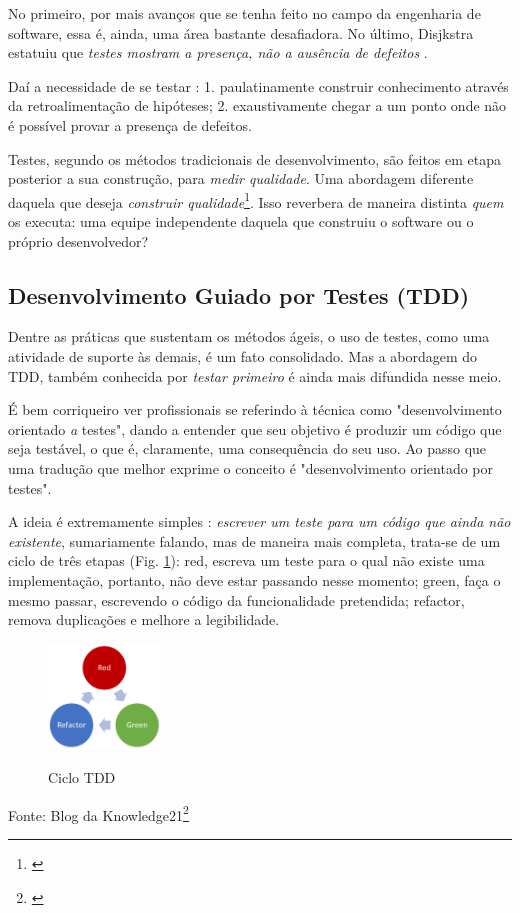 \documentclass[12pt,a4paper,oneside,english,brazil]{article}
\begin{document}
    No primeiro, por mais avanços que se tenha feito no campo da engenharia de
    software, essa é, ainda, uma área bastante desafiadora. No último, Disjkstra
    estatuiu que \emph{testes mostram a presença, não a ausência de defeitos}
    \cite[p. 16]{Nato1969}.

    Daí a necessidade de se testar \cite[p. xxix-xxx]{Mezaros2007}: 1.
    paulatinamente construir conhecimento através da retroalimentação de
    hipóteses; 2. exaustivamente chegar a um ponto onde não é possível provar a
    presença de defeitos.

    Testes, segundo os métodos tradicionais de desenvolvimento, são feitos em
    etapa posterior a sua construção, para \emph{medir qualidade}. Uma abordagem
    diferente daquela que deseja \emph{construir qualidade}\footnote{\cite[p. 7]
    {FarcicGarcia2015}}. Isso reverbera de maneira
    distinta \emph{quem} os executa: uma equipe independente daquela que
    construiu o software ou o próprio desenvolvedor?


    \subsection{Desenvolvimento Guiado por Testes (TDD)}

      Dentre as práticas que sustentam os métodos ágeis, o uso de testes, como
      uma atividade de suporte às demais, é um fato consolidado. Mas a abordagem
      do TDD, também conhecida por \emph{testar primeiro} é ainda mais difundida
      nesse  meio.

      É bem corriqueiro ver profissionais se referindo à  técnica como
      "desenvolvimento orientado \emph{a} testes", dando a entender que seu
      objetivo é produzir um código que seja testável, o que é, claramente, uma
      consequência do seu uso. Ao passo que uma tradução que melhor exprime o
      conceito é "desenvolvimento orientado {por} testes".

      A ideia é extremamente simples \cite[p.1]{FreemanPryce2009}: \emph{escrever um
      teste para um código que ainda não existente}, sumariamente falando, mas
      de maneira mais completa, trata-se de um ciclo de três etapas (Fig.
      \ref{fig:ciclotdd}): red,  escreva um teste para o qual não existe uma
      implementação, portanto, não deve estar passando nesse momento; green, faça
      o mesmo passar, escrevendo o código da funcionalidade pretendida; refactor,
      remova duplicações e melhore a legibilidade.

      \begin{center}
        \begin{figure}[h]
          \centering
          \caption{Ciclo TDD}
          \includegraphics[width=3cm]{ciclo-tdd}
          \label{fig:ciclotdd}
        \end{figure}
        Fonte: Blog da Knowledge21\footnote{\cite{Ferreira2018}}
      \end{center}
\end{document}
